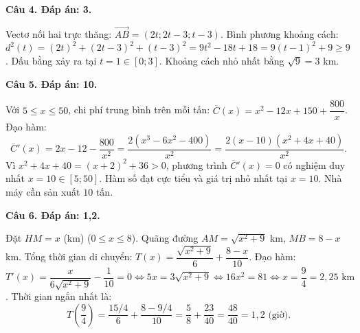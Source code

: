 \documentclass[12pt,a4paper]{article}
\newcommand{\loigiai}[1]{\par\medskip\Needspace{4\baselineskip}\noindent\textbf{#1}\par\nobreak}
\begin{document}
\loigiai{Câu 4. Đáp án: 3.}
Vectơ nối hai trực thăng: $\overrightarrow{AB}=(2t;2t-3;t-3)$.
Bình phương khoảng cách:
$d^2(t)=(2t)^2+(2t-3)^2+(t-3)^2=9t^2-18t+18=9(t-1)^2+9\ge9$.
Dấu bằng xảy ra tại $t=1\in[0;3]$. Khoảng cách nhỏ nhất bằng $\sqrt9=3$ km.

\newpage
\loigiai{Câu 5. Đáp án: 10.}
Với $5\le x\le50$, chi phí trung bình trên mỗi tấn:
$\overline{C}(x)=x^2-12x+150+\dfrac{800}{x}$.
Đạo hàm:
\[
\overline{C}'(x)=2x-12-\frac{800}{x^2}=\frac{2(x^3-6x^2-400)}{x^2}=\frac{2(x-10)(x^2+4x+40)}{x^2}.
\]
Vì $x^2+4x+40=(x+2)^2+36>0$, phương trình $\overline{C}'(x)=0$ có nghiệm duy nhất $x=10\in[5;50]$.
Hàm số đạt cực tiểu và giá trị nhỏ nhất tại $x=10$. Nhà máy cần sản xuất $10$ tấn.

\loigiai{Câu 6. Đáp án: 1,2.}
Đặt $HM=x$ (km) ($0\le x\le8$). Quãng đường $AM=\sqrt{x^2+9}$ km, $MB=8-x$ km.
Tổng thời gian di chuyển:
$T(x)=\dfrac{\sqrt{x^2+9}}6+\dfrac{8-x}{10}$.
Đạo hàm:
$T'(x)=\dfrac{x}{6\sqrt{x^2+9}}-\dfrac1{10}=0\Longleftrightarrow 5x=3\sqrt{x^2+9}\Longleftrightarrow 16x^2=81\Longleftrightarrow x=\dfrac94=2{,}25\text{ km}$.
Thời gian ngắn nhất là:
\[
T\left(\frac94\right)=\frac{15/4}6+\frac{8-9/4}{10}=\frac58+\frac{23}{40}=\frac{48}{40}=1{,}2\text{ (giờ)}.
\]
\end{document}
